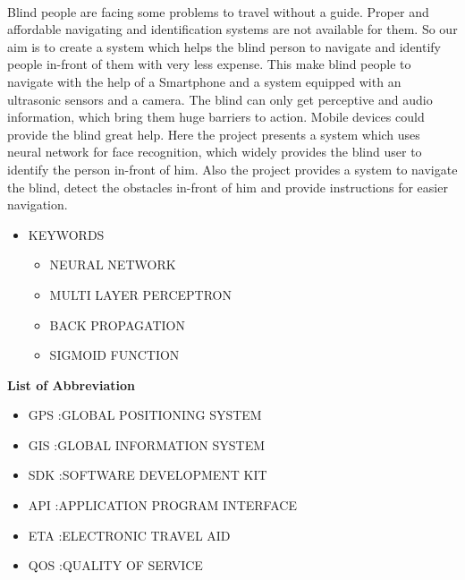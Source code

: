 \documentclass[10pt,a4paper,twoside]{report}
\newcommand\blankpage{
	\null
	\thispagestyle{empty}
	\addtocounter{page}{-1}
	\newpage}
\begin{document}
\paragraph{ }
Blind people are facing some problems to travel without a guide. Proper and affordable navigating and identification systems are not available for them. So our aim is to create a system which helps the blind person to navigate and identify people in-front of them with very less expense. This make blind people to navigate with the help of a Smartphone and a system equipped with an ultrasonic sensors and a camera. The blind can only get perceptive and audio information, which bring them huge barriers to action. Mobile devices could provide the blind great help. Here the project presents a system which uses neural network for face recognition, which widely provides the blind user to identify the person in-front of him. Also the  project provides a system to navigate the blind, detect the obstacles in-front of him and provide instructions for easier navigation.
\begin{itemize}
\item KEYWORDS
\begin{itemize}
\item NEURAL NETWORK
\item MULTI LAYER PERCEPTRON
\item BACK PROPAGATION
\item SIGMOID FUNCTION

\end{itemize}
 \newpage
\blankpage

\end{itemize}
 

\setcounter{page}{0}

\tableofcontents
\listoffigures
\newpage
\begin{LARGE}
\textbf{List of Abbreviation}
\end{LARGE}
\begin{small}


\begin{itemize}
\item GPS \hspace{4mm}  :GLOBAL POSITIONING SYSTEM
\item GIS \hspace{5mm} :GLOBAL INFORMATION SYSTEM
\item SDK \hspace{3.6mm} :SOFTWARE DEVELOPMENT KIT
\item API  \hspace{6mm}:APPLICATION PROGRAM INTERFACE
\item ETA \hspace{3.6mm} :ELECTRONIC TRAVEL AID
\item QOS  \hspace{4.7mm}:QUALITY OF SERVICE

\end{itemize}
\end{small}
\end{document}
